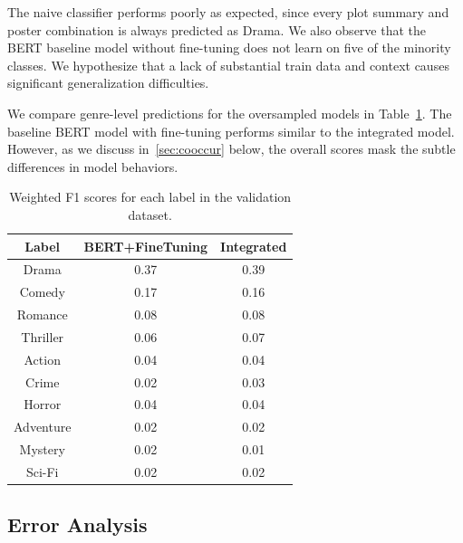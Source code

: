 \documentclass[10pt]{article}
\begin{document}
The naive classifier performs poorly as expected, since every plot summary and poster combination is always predicted as Drama. We also observe that the BERT baseline model without fine-tuning does not learn on five of the minority classes. We hypothesize that a lack of substantial train data and context causes significant generalization difficulties. 

We compare genre-level predictions for the oversampled models in Table~\ref{F1Compare}. The baseline BERT model with fine-tuning performs similar to the integrated model. However, as we discuss in~\ref{sec:cooccur} below, the overall scores mask the subtle differences in model behaviors.

\begin{table}[h]
\begin{center}
\begin{tabular}{ccc}
\hline \bf Label & \bf BERT+FineTuning  & \bf Integrated  \\
\hline
Drama & 0.37 &  0.39  \\
Comedy & 0.17 & 0.16\\
Romance & 0.08 & 0.08  \\
Thriller & 0.06 & 0.07 \\
Action & 0.04 & 0.04 \\
Crime & 0.02 & 0.03 \\
Horror & 0.04 & 0.04  \\
Adventure &  0.02 & 0.02  \\
Mystery & 0.02  & 0.01  \\
Sci-Fi & 0.02 & 0.02  \\
\hline
\end{tabular}
\end{center}
\captionsetup{justification=centering}
\caption{\label{F1Compare} Weighted F1 scores for each label in the validation dataset. }
\end{table}

\subsection{Error Analysis}
\end{document}
